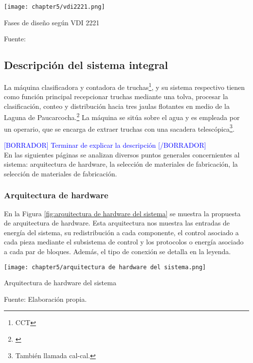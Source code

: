\begin{myfigure}[H]
	\centering
	\texttt{[image: chapter5/vdi2221.png]}
	\caption{Fases de diseño según VDI 2221}
	\begin{myflushleftportland}
		Fuente: \cite{Pahl2007}
	\end{myflushleftportland}
	\label{fig:vdi2221}
\end{myfigure}



\subsection{Descripción del sistema integral}
\label{ssec:descripcion del sistema integral}

La máquina clasificadora y contadora de truchas\footnote{CCT}, y su sistema respectivo tienen como función principal recepcionar truchas mediante una tolva, procesar la clasificación, conteo y distribución hacia tres jaulas flotantes en medio de la Laguna de Paucarcocha.\footnote{\cite{DiazVergara2020}} La máquina se sitúa sobre el agua y es empleada por un operario, que se encarga de extraer truchas con una sacadera telescópica\footnote{También llamada cal-cal.}.

\textcolor{blue}{[BORRADOR] Terminar de explicar la descripción [/BORRADOR]}\\

En las siguientes páginas se analizan diversos puntos generales concernientes al sistema: arquitectura de hardware, la selección de materiales de fabricación, la selección de materiales de fabricación.


\subsubsection{Arquitectura de hardware}

En la Figura \ref{fig:arquitectura de hardware del sistema} se muestra la propuesta de arquitectura de hardware. Esta arquitectura nos muestra las entradas de energía del sistema, su redistribución a cada componente, el control asociado a cada pieza mediante el subsistema de control y los protocolos o energía asociado a cada par de bloques. Además, el tipo de conexión se detalla en la leyenda.

\begin{myfigure}[H]
	\centering
	\texttt{[image: chapter5/arquitectura de hardware del sistema.png]}
	\caption{Arquitectura de hardware del sistema}
	\begin{myflushleftportland}
		Fuente: Elaboración propia.
	\end{myflushleftportland}
	\label{fig:arquitectura de hardware del sistema}
\end{myfigure}


